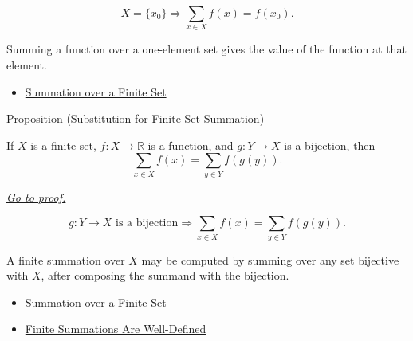 \begin{remark*}
\[
  X=\{x_0\}\Longrightarrow \sum_{x\in X}f(x)=f(x_0).
\]
\end{remark*}

\begin{remark*}[Interpretation]
Summing a function over a one-element set gives the value of the function
at that element.
\end{remark*}

\begin{dependencies}
\begin{itemize}
  \item \hyperref[def:summation-over-finite-set]{Summation over a Finite Set}
\end{itemize}
\end{dependencies}

\begin{propositionbox}{Proposition (Substitution for Finite Set Summation)}
\begin{proposition}
\label{prop:substitution-finite-set-summation}

If \(X\) is a finite set, \(f:X\to\mathbb{R}\) is a function, and
\(g:Y\to X\) is a bijection, then
\[
  \sum_{x\in X} f(x)
  =
  \sum_{y\in Y} f(g(y)).
\]

\smallskip
\noindent
\hyperref[prf:substitution-finite-set-summation]{\textit{Go to proof.}}
\end{proposition}
\end{propositionbox}

\begin{remark*}
\[
  g:Y\to X\text{ is a bijection}
  \Longrightarrow
  \sum_{x\in X}f(x)=\sum_{y\in Y}f(g(y)).
\]
\end{remark*}

\begin{remark*}[Interpretation]
A finite summation over \(X\) may be computed by summing over any set
bijective with \(X\), after composing the summand with the bijection.
\end{remark*}

\begin{dependencies}
\begin{itemize}
  \item \hyperref[def:summation-over-finite-set]{Summation over a Finite Set}
  \item \hyperref[prop:finite-summations-well-defined]{Finite Summations Are Well-Defined}
\end{itemize}
\end{dependencies}

